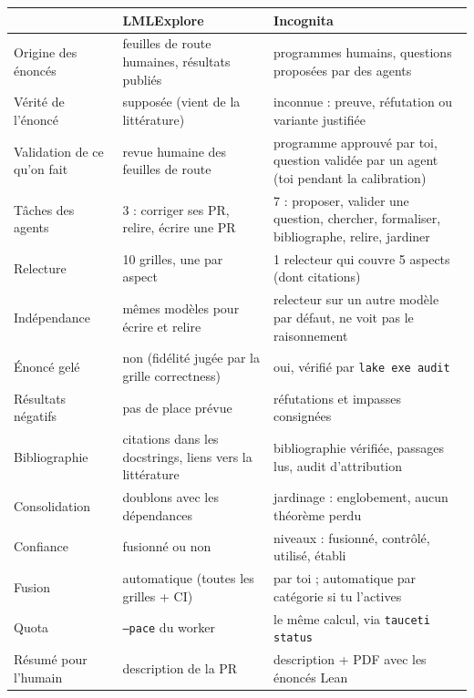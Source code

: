 \documentclass[11pt,a4paper]{article}
\newcommand{\cmd}[1]{\texttt{#1}}
\newcommand{\proj}{\textsf{Incognita}}
\newcommand{\lmlx}{\textsf{LMLExplore}}
\begin{document}
\begin{center}
\small
\begin{tabularx}{\linewidth}{@{}lLL@{}}
\toprule
& \lmlx{} & \proj{} \\
\midrule
Origine des énoncés & feuilles de route humaines, résultats publiés & programmes humains, questions proposées par des agents \\
Vérité de l'énoncé & supposée (vient de la littérature) & inconnue : preuve, réfutation ou variante justifiée \\
Validation de ce qu'on fait & revue humaine des feuilles de route & programme approuvé par toi, question validée par un agent (toi pendant la calibration) \\
Tâches des agents & 3 : corriger ses PR, relire, écrire une PR & 7 : proposer, valider une question, chercher, formaliser, bibliographe, relire, jardiner \\
Relecture & 10 grilles, une par aspect & 1 relecteur qui couvre 5 aspects (dont citations) \\
Indépendance & mêmes modèles pour écrire et relire & relecteur sur un autre modèle par défaut, ne voit pas le raisonnement \\
Énoncé gelé & non (fidélité jugée par la grille correctness) & oui, vérifié par \cmd{lake exe audit} \\
Résultats négatifs & pas de place prévue & réfutations et impasses consignées \\
Bibliographie & citations dans les docstrings, liens vers la littérature & bibliographie vérifiée, passages lus, audit d'attribution \\
Consolidation & doublons avec les dépendances & jardinage : englobement, aucun théorème perdu \\
Confiance & fusionné ou non & niveaux : fusionné, contrôlé, utilisé, établi \\
Fusion & automatique (toutes les grilles + CI) & par toi ; automatique par catégorie si tu l'actives \\
Quota & \cmd{--pace} du worker & le même calcul, via \cmd{tauceti status} \\
Résumé pour l'humain & description de la PR & description + PDF avec les énoncés Lean \\
\bottomrule
\end{tabularx}
\end{center}
\end{document}
